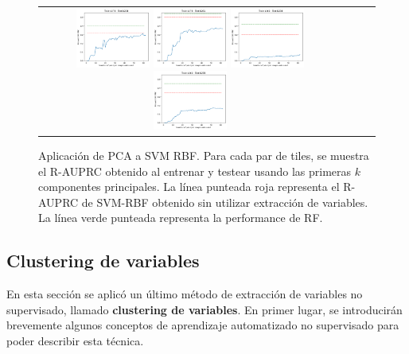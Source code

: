 \begin{figure}[h!]
\begin{tabular}{cccc}
\includegraphics[width=0.25\textwidth]{Kap5/rbf_INDIVIDUAL_CURVES_train=b278test=b234.png}  \includegraphics[width=0.25\textwidth]{Kap5/rbf_INDIVIDUAL_CURVES_train=b278test=b261.png} 
 \includegraphics[width=0.25\textwidth]{Kap5/rbf_INDIVIDUAL_CURVES_train=b360test=b234.png}  \includegraphics[width=0.25\textwidth]{Kap5/rbf_INDIVIDUAL_CURVES_train=b360test=b278.png} 
\end{tabular}
\caption{Aplicación de PCA a SVM RBF. Para cada par de tiles, se muestra el R-AUPRC obtenido al entrenar y testear usando las primeras $k$ componentes principales. La línea punteada roja representa el R-AUPRC de SVM-RBF obtenido sin utilizar extracción de variables. La línea verde punteada representa la performance de RF.}
\label{fig:pca_k}
\end{figure}

\subsection{Clustering de variables}

En esta sección se aplicó un último método de extracción de variables no supervisado, llamado \textbf{clustering de variables}. En primer lugar, se introducirán brevemente algunos conceptos de aprendizaje automatizado no supervisado para poder describir esta técnica. \\

